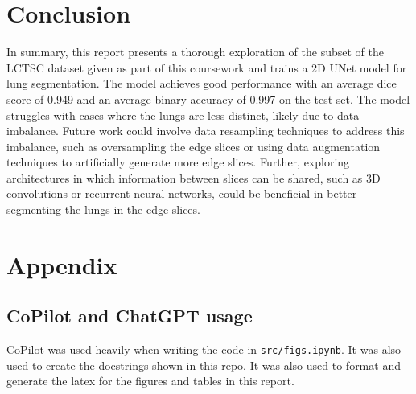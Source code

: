 \documentclass[11pt]{article}
\begin{document}
\section{Conclusion}
In summary, this report presents a thorough exploration of the subset of the LCTSC dataset given as part of this coursework and trains a 2D UNet model for lung segmentation. The model achieves good performance with an average dice score of 0.949 and an average binary accuracy of 0.997 on the test set. The model struggles with cases where the lungs are less distinct, likely due to data imbalance. Future work could involve data resampling techniques to address this imbalance, such as oversampling the edge slices or using data augmentation techniques to artificially generate more edge slices. Further, exploring architectures in which information between slices can be shared, such as 3D convolutions or recurrent neural networks, could be beneficial in better segmenting the lungs in the edge slices.


\section{Appendix}
\subsection{CoPilot and ChatGPT usage}
CoPilot was used heavily when writing the code in \texttt{src/figs.ipynb}. It was 
also used to create the docstrings shown in this repo. It was also used to format and generate the latex for the figures and tables in this report.
\end{document}
